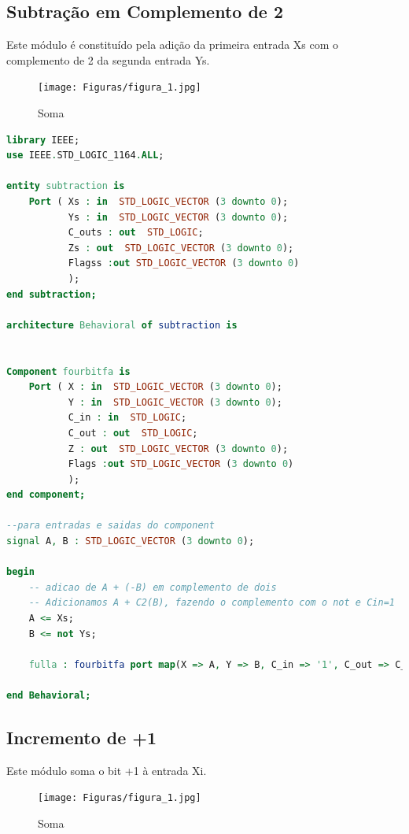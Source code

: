 \documentclass[a4paper, 12pt]{article}
\begin{document}
\subsection{Subtração em Complemento de 2}
Este módulo é constituído pela adição da primeira entrada Xs com o complemento de 2 da segunda entrada Ys.

\begin{figure}[H]
\caption{Soma}
\centering
\texttt{[image: Figuras/figura\_1.jpg]}
\label{figura:qualquernome}
\end{figure}

\begin{lstlisting}[language=VHDL]
library IEEE;
use IEEE.STD_LOGIC_1164.ALL;

entity subtraction is
    Port ( Xs : in  STD_LOGIC_VECTOR (3 downto 0);
           Ys : in  STD_LOGIC_VECTOR (3 downto 0);
           C_outs : out  STD_LOGIC;
           Zs : out  STD_LOGIC_VECTOR (3 downto 0);
		   Flagss :out STD_LOGIC_VECTOR (3 downto 0)
		   );
end subtraction;

architecture Behavioral of subtraction is


Component fourbitfa is
    Port ( X : in  STD_LOGIC_VECTOR (3 downto 0);
           Y : in  STD_LOGIC_VECTOR (3 downto 0);
           C_in : in  STD_LOGIC;
           C_out : out  STD_LOGIC;
           Z : out  STD_LOGIC_VECTOR (3 downto 0);
		   Flags :out STD_LOGIC_VECTOR (3 downto 0)
		   );
end component;

--para entradas e saidas do component
signal A, B : STD_LOGIC_VECTOR (3 downto 0);

begin
	-- adicao de A + (-B) em complemento de dois
	-- Adicionamos A + C2(B), fazendo o complemento com o not e Cin=1
	A <= Xs;
	B <= not Ys;
	
	fulla : fourbitfa port map(X => A, Y => B, C_in => '1', C_out => C_outs, Z => Zs, Flags => Flagss);

end Behavioral;
\end{lstlisting}


\subsection{Incremento de +1}
Este módulo soma o bit +1 à entrada Xi.

\begin{figure}[H]
\caption{Soma}
\centering
\texttt{[image: Figuras/figura\_1.jpg]}
\label{figura:qualquernome}
\end{figure}
\end{document}
